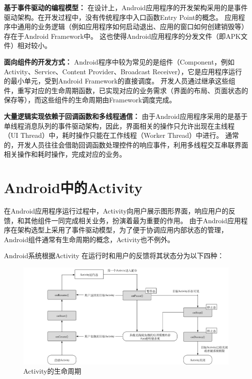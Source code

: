\textbf{基于事件驱动的编程模型：}
在设计上，Android应用程序的开发架构采用的是事件驱动架构。在开发过程中，没有传统程序中入口函数Entry Point的概念。
应用程序中通用的业务逻辑（例如应用程序如何启动退出、应用的窗口如何创建销毁等）存在于Android Framework中。
这也使得Android应用程序的分发文件（即APK文件）相对较小。

\textbf{面向组件的开发方式：}
Android程序中较为常见的是组件（Component，例如Activity、Service、Content Provider、Broadcast Receiver），它是应用程序运行的最小单元，受到Android Framework的直接调度。
开发人员通过继承这些组件，重写对应的生命周期函数，已实现对应的业务需求（界面的布局、页面状态的保存等），而这些组件的生命周期由Framework调度完成。

\textbf{大量逻辑实现依赖于回调函数和多线程通信：}
由于Android应用程序采用的是基于单线程消息队列的事件驱动架构，因此，界面相关的操作只允许出现在主线程（UI Thread）中，耗时操作只能在工作线程（Worker Thread）中进行。
通常的，开发人员往往会借助回调函数处理控件的响应事件，利用多线程交互串联界面相关操作和耗时操作，完成对应的业务。


\section{Android中的Activity}



在Android应用程序运行过程中，Activity向用户展示图形界面，响应用户的反馈，和其他组件一同完成相关业务，扮演着最为重要的作用\cite{Activity2:online}。
由于Android应用程序在架构选型上采用了事件驱动模型，为了便于协调应用内部状态的管理，Android组件通常有生命周期的概念，Activity也不例外。

Android系统根据Activity 在运行时和用户的反馈将其状态分为以下四种：


\begin{figure}[!ht]
	\centering
		\includegraphics[width=\textwidth]{./Figures/Activity-lifecycle-Landscape.png}

	\caption{Activity的生命周期}
	\label{fig:Activity-lifecycle}
\end{figure}


